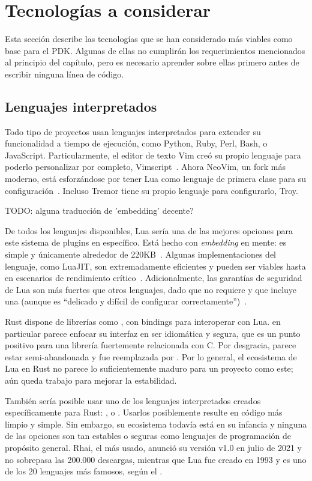 \section{Tecnologías a considerar}

Esta sección describe las tecnologías que se han considerado más viables como
base para el PDK. Algunas de ellas no cumplirán los requerimientos mencionados
al principio del capítulo, pero es necesario aprender sobre ellas primero antes
de escribir ninguna línea de código.

\subsection{Lenguajes interpretados}

Todo tipo de proyectos usan lenguajes interpretados para extender su
funcionalidad a tiempo de ejecución, como Python, Ruby, Perl, Bash, o
JavaScript. Particularmente, el editor de texto Vim creó su propio lenguaje para
poderlo personalizar por completo, Vimscript~\cite{vimscript}. Ahora NeoVim, un
fork más moderno, está esforzándose por tener Lua como lenguaje de primera clase
para su configuración~\cite{nvimlua}. Incluso Tremor tiene su propio lenguaje
para configurarlo, Troy.

TODO: alguna traducción de 'embedding' decente?

De todos los lenguajes disponibles, Lua sería una de las mejores opciones para
este sistema de plugins en específico. Está hecho con \emph{embedding} en mente:
es simple y únicamente alrededor de 220KB~\cite{ierusalimschy2006programming}.
Algunas implementaciones del lenguaje, como LuaJIT, son extremadamente
eficientes y pueden ser viables hasta en escenarios de rendimiento
crítico~\cite{luajitperf}. Adicionalmente, las garantías de seguridad de Lua son
más fuertes que otros lenguajes, dado que no requiere \unsafe y que incluye una
\sandbox (aunque es ``delicado y difícil de configurar
correctamente'')~\cite{luasandboxes}.

Rust dispone de librerías como , con bindings para interoperar
con Lua.  en particular parece enfocar su interfaz en ser idiomática
y segura, que es un punto positivo para una librería fuertemente relacionada con
C. Por desgracia, parece estar semi-abandonada y fue reemplazada por
. Por lo general, el ecosistema de Lua en Rust no parece lo
suficientemente maduro para un proyecto como este; aún queda trabajo para
mejorar la estabilidad.

También sería posible usar uno de los lenguajes interpretados creados
específicamente para Rust: \textcite{cratesiogluon}, \textcite{cratesiorhai} o
\textcite{cratesiorune}. Usarlos posiblemente resulte en código más limpio y
simple. Sin embargo, su ecosistema todavía está en su infancia y ninguna de las
opciones son tan estables o seguras como lenguajes de programación de propósito
general. Rhai, el más usado, anunció su versión v1.0 en julio de 2021 y no
sobrepasa las 200.000 descargas, mientras que Lua fue creado en 1993 y es uno de
los 20 lenguajes más famosos, según el \textcite{tiobe}.

